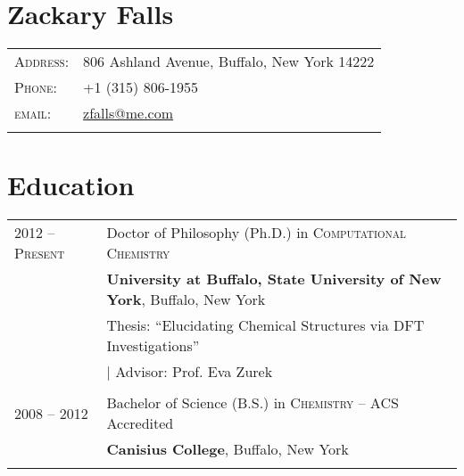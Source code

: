 \documentclass[letterpaper,10pt]{article} %
\begin{document}
\pagestyle{empty} %


\section{\Huge \textbf{ Zackary Falls}}
\noindent 
\begin{tabular}{R{1.7cm}l}

\textsc{Address:} & 806 Ashland Avenue, Buffalo, New York 14222 \\
\textsc{Phone:} & +1 (315) 806-1955\\
\textsc{email:} & \href{mailto:zfalls@me.com}{zfalls@me.com} \\
 \\

\end{tabular}




\section{Education}
\noindent 
\begin{tabular}{R{3cm}|p{13cm}} 

\textsc{2012 -- Present} & Doctor of Philosophy (Ph.D.) in \textsc{Computational Chemistry} \\ 
& \textbf{University at Buffalo, State University of New York}, Buffalo, New York \\
& \hspace{3mm} \small Thesis: ``Elucidating Chemical Structures via DFT Investigations'' \\
& \hspace{3mm} \small | Advisor: Prof. Eva Zurek \\
 \\


\textsc{2008 -- 2012} & Bachelor of Science (B.S.) in \textsc{}\textsc{Chemistry} -- ACS Accredited \\
& \normalsize\textbf{Canisius College}, Buffalo, New York\\
 \\

\end{tabular}
\end{document}

